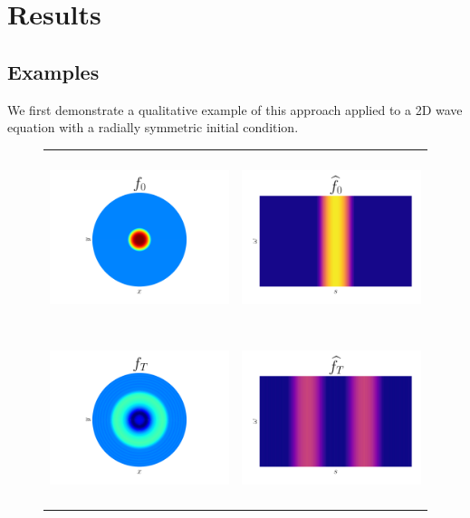 
\newpage
\section{Results}

\subsection{Examples}

We first demonstrate a qualitative example of this approach applied to a 2D wave equation with a radially symmetric initial condition.
\FloatBarrier
\begin{figure}[H]
    \begin{tabular}{cc}
        \includegraphics[height=5cm]{figures/Physical_Initial.pdf} & \includegraphics[height=5cm]{figures/Radon_Initial.pdf} \\ 
        \includegraphics[height=5cm]{figures/Physical_Final.pdf} & \includegraphics[height=5cm]{figures/Radon_Final.pdf}

\end{tabular}
\end{figure}
